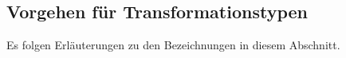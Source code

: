 % 

\subsection{Vorgehen für Transformationstypen}

Es folgen Erläuterungen zu den Bezeichnungen in diesem Abschnitt. \par


